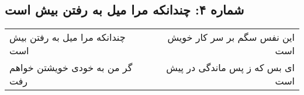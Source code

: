 \begin{center}
\section*{شماره ۴: چندانکه مرا میل به رفتن بیش است}
\label{sec:004}
\begin{longtable}{l p{0.5cm} r}
چندانکه مرا میل به رفتن بیش است
&&
این نفس سگم بر سر کار خویش است
\\
گر من به خودی خویشتن خواهم رفت
&&
ای بس که ز پس ماندگی در پیش است
\\
\end{longtable}
\end{center}
